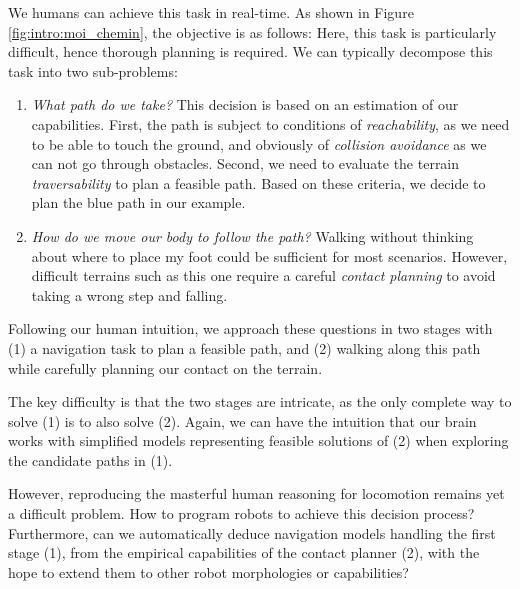We humans can achieve this task in real-time. 
As shown in Figure \ref{fig:intro:moi_chemin}, the objective is as follows: 
Here, this task is particularly difficult, hence thorough planning is required.
We can typically decompose this task into two sub-problems:
\begin{enumerate}
    \item \textit{What path do we take?} 
    This decision is based on an estimation of our capabilities. 
    First, the path is subject to conditions of \textit{reachability}, as we need to be able to touch the ground, and obviously of \textit{collision avoidance} as we can not go through obstacles.
    Second, we need to evaluate the terrain \textit{traversability} to plan a feasible path. 
    Based on these criteria, we decide to plan the blue path in our example.
    \item \textit{How do we move our body to follow the path?} 
    Walking without thinking about where to place my foot could be sufficient for most scenarios. However, difficult terrains such as this one require a careful \textit{contact planning} to avoid taking a wrong step and falling.
\end{enumerate}
Following our human intuition, we approach these questions in two stages with (1) a navigation task to plan a feasible path, and (2) walking along this path while carefully planning our contact on the terrain.

The key difficulty is that the two stages are intricate, as the only complete way to solve (1) is to also solve (2).
Again, we can have the intuition that our brain works with simplified models representing feasible solutions of (2) when exploring the candidate paths in (1).


However, reproducing the masterful human reasoning for locomotion remains yet a difficult problem. How to program robots to achieve this decision process?
Furthermore, can we automatically deduce navigation models handling the first stage (1), from the empirical capabilities of the contact planner (2), with the hope to extend them to other robot morphologies or capabilities?



